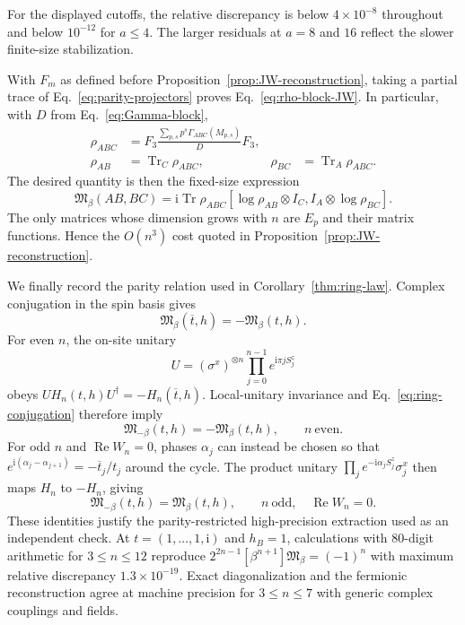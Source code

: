 \documentclass[aps,prb,preprint,nofootinbib,longbibliography]{revtex4-2}
\newcommand{\Tr}{\operatorname{Tr}}
\newcommand{\Mmod}{\mathfrak{M}}
\newcommand{\ii}{\mathrm{i}}
\begin{document}
For the displayed cutoffs, the relative discrepancy is below
$4\times10^{-8}$ throughout and below $10^{-12}$ for $a\le4$.  The larger
residuals at $a=8$ and $16$ reflect the slower finite-size stabilization.

With $F_m$ as defined before Proposition~\ref{prop:JW-reconstruction},
taking a partial trace of Eq.~\eqref{eq:parity-projectors} proves
Eq.~\eqref{eq:rho-block-JW}.  In particular, with
$D$ from Eq.~\eqref{eq:Gamma-block},
\begin{align}
 \rho_{ABC}&=F_3\frac{\sum_{p,s}p^s\Gamma_{ABC}(M_{p,s})}{D}F_3,
 \label{eq:rhoABC-JW}\\
 \rho_{AB}&=\Tr_C\rho_{ABC},
 &\rho_{BC}&=\Tr_A\rho_{ABC}.
 \label{eq:rhoABBC-JW}
\end{align}
The desired quantity is then the fixed-size expression
\begin{equation}
 \Mmod_\beta(AB,BC)=\ii\Tr\rho_{ABC}
 \left[\log\rho_{AB}\otimes I_C,
 I_A\otimes\log\rho_{BC}\right].
 \label{eq:M-JW-closed}
\end{equation}
The only matrices whose dimension grows with $n$ are $E_p$ and their matrix
functions.  Hence the $O(n^3)$ cost quoted in Proposition~\ref{prop:JW-reconstruction}.

We finally record the parity relation used in Corollary~\ref{thm:ring-law}.
Complex conjugation in the spin basis gives
\begin{equation}
 \Mmod_\beta(\overline t,h)=-\Mmod_\beta(t,h).
 \label{eq:ring-conjugation}
\end{equation}
For even $n$, the on-site unitary
\begin{equation}
 U=(\sigma^x)^{\otimes n}\prod_{j=0}^{n-1}e^{\ii\pi jS_j^z}
 \label{eq:even-ring-U}
\end{equation}
obeys $UH_n(t,h)U^\dagger=-H_n(\overline t,h)$.  Local-unitary invariance and
Eq.~\eqref{eq:ring-conjugation} therefore imply
\begin{equation}
 \Mmod_{-\beta}(t,h)=-\Mmod_\beta(t,h),
 \qquad n\ \text{even}.
 \label{eq:even-ring-parity}
\end{equation}
For odd $n$ and $\operatorname{Re}W_n=0$, phases $\alpha_j$ can instead be
chosen so that
$e^{\ii(\alpha_j-\alpha_{j+1})}=-\overline t_j/t_j$ around the cycle.  The
product unitary $\prod_je^{-\ii\alpha_jS_j^z}\sigma_j^x$ then maps $H_n$ to
$-H_n$, giving
\begin{equation}
 \Mmod_{-\beta}(t,h)=\Mmod_\beta(t,h),
 \qquad n\ \text{odd},\quad\operatorname{Re}W_n=0.
 \label{eq:odd-ring-parity}
\end{equation}
These identities justify the parity-restricted high-precision extraction
used as an independent check.  At
$t=(1,\ldots,1,\ii)$ and $h_B=1$, calculations with 80-digit arithmetic for
$3\le n\le12$ reproduce
$2^{2n-1}[\beta^{n+1}]\Mmod_\beta=(-1)^n$ with maximum relative discrepancy
$1.3\times10^{-19}$.  Exact diagonalization and the fermionic reconstruction
agree at machine precision for $3\le n\le7$ with generic complex couplings
and fields.
\end{document}
